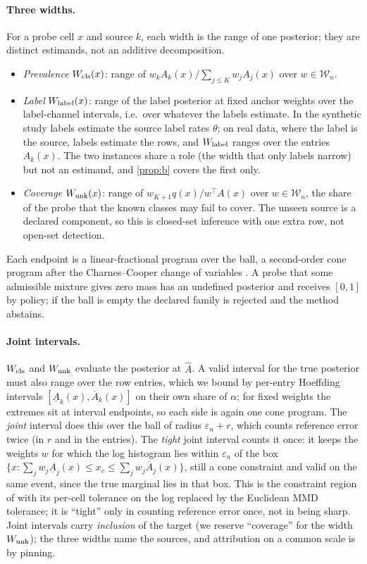 \paragraph{Three widths.} For a probe cell $x$ and source $k$, each width is the range of one
posterior; they are distinct estimands, not an additive decomposition.
\begin{itemize}
\item \emph{Prevalence} $W_{\mathrm{cls}}(x)$: range of $w_kA_k(x)/\sum_{j\le K}w_jA_j(x)$ over $w\in\mathcal W_n$.
\item \emph{Label} $W_{\mathrm{label}}(x)$: range of the label posterior at fixed anchor weights over the
label-channel intervals, i.e.\ over whatever the labels estimate. In the synthetic study labels
estimate the source label rates $\theta$; on real data, where the label is the source, labels
estimate the rows, and $W_{\mathrm{label}}$ ranges over the entries $A_k(x)$. The two instances share a role
(the width that only labels narrow) but not an estimand, and \cref{prop:b} covers the first only.
\item \emph{Coverage} $W_{\mathrm{unk}}(x)$: range of $w_{K+1}q(x)/w^{\top}A(x)$ over $w\in\mathcal W_n$, the
share of the probe that the known classes may fail to cover. The unseen source is a declared
component, so this is closed-set inference with one extra row, not open-set detection.
\end{itemize}
Each endpoint is a linear-fractional program over the ball, a second-order cone program after the
Charnes--Cooper change of variables \citep{charnes1962programming}. A probe that some admissible
mixture gives zero mass has an undefined posterior and receives $[0,1]$ by policy; if the ball is
empty the declared family is rejected and the method abstains.

\paragraph{Joint intervals.} $W_{\mathrm{cls}}$ and $W_{\mathrm{unk}}$ evaluate the posterior at $\hat A$. A valid interval
for the true posterior must also range over the row entries, which we bound by per-entry Hoeffding
intervals $[\underline A_k(x),\overline A_k(x)]$ on their own share of $\alpha$; for fixed weights the
extremes sit at interval endpoints, so each side is again one cone program. The \emph{joint} interval
does this over the ball of radius $\varepsilon_n+r$, which counts reference error twice (in $r$ and in
the entries). The \emph{tight} joint interval counts it once: it keeps the weights $w$ for which the log
histogram lies within $\varepsilon_n$ of the box $\{x:\sum_jw_j\underline A_j(x)\le x_c\le\sum_jw_j\overline
A_j(x)\}$, still a cone constraint and valid on the same event, since the true marginal lies in that box.
This is the constraint region of \citet{li2026matrix} with its per-cell tolerance on the log replaced by
the Euclidean MMD tolerance; it is ``tight'' only in counting reference error once, not in being sharp.
Joint intervals carry \emph{inclusion} of the target (we reserve ``coverage'' for the width $W_{\mathrm{unk}}$);
the three widths name the sources, and attribution on a common scale is by pinning.

